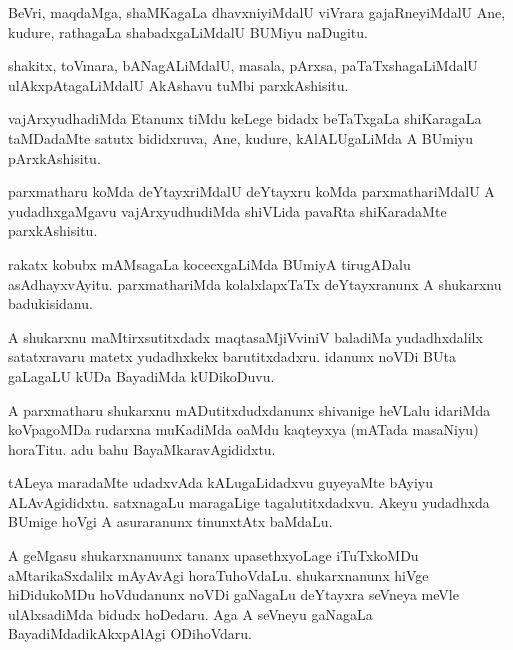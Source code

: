 \documentclass{article}
\begin{document}
\begin{mn}%
BeVri, maqdaMga, shaMKagaLa dhavxniyiMdalU viVrara gajaRneyiMdalU Ane, kudure, rathagaLa 
shabadxgaLiMdalU BUMiyu naDugitu.
\end{mn}

\begin{mn}%
shakitx, toVmara, bANagALiMdalU, masala, pArxsa, paTaTxshagaLiMdalU ulAkxpAtagaLiMdalU AkAshavu 
tuMbi parxkAshisitu.
\end{mn}

\begin{mn}%
vajArxyudhadiMda Etanunx tiMdu keLege bidadx beTaTxgaLa shiKaragaLa taMDadaMte satutx bididxruva, 
Ane, kudure, kAlALUgaLiMda A BUmiyu pArxkAshisitu.
\end{mn}

\begin{mn}%
parxmatharu koMda deYtayxriMdalU deYtayxru koMda parxmathariMdalU A yudadhxgaMgavu vajArxyudhudiMda 
shiVLida pavaRta shiKaradaMte parxkAshisitu.
\end{mn}

\begin{mn}%
rakatx kobubx mAMsagaLa kocecxgaLiMda BUmiyA tirugADalu asAdhayxvAyitu. parxmathariMda 
kolalxlapxTaTx deYtayxranunx A shukarxnu badukisidanu.
\end{mn}

\begin{mn}%
A shukarxnu maMtirxsutitxdadx maqtasaMjiVviniV baladiMa yudadhxdalilx satatxravaru matetx 
yudadhxkekx barutitxdadxru. idanunx noVDi BUta gaLagaLU kUDa BayadiMda kUDikoDuvu.
\end{mn}

\begin{mn}%
A parxmatharu shukarxnu mADutitxdudxdanunx shivanige heVLalu idariMda koVpagoMDa rudarxna muKadiMda 
oaMdu kaqteyxya (mATada masaNiyu) horaTitu. adu bahu BayaMkaravAgididxtu.
\end{mn}

\begin{mn}%
tALeya maradaMte udadxvAda kALugaLidadxvu guyeyaMte bAyiyu ALAvAgididxtu. satxnagaLu maragaLige 
tagalutitxdadxvu. Akeyu yudadhxda BUmige hoVgi A asuraranunx tinunxtAtx baMdaLu.
\end{mn}

\begin{mn}%
A geMgasu shukarxnanuunx tananx upasethxyoLage iTuTxkoMDu aMtarikaSxdalilx mAyAvAgi horaTuhoVdaLu. 
shukarxnanunx hiVge hiDidukoMDu hoVdudanunx noVDi gaNagaLu deYtayxra seVneya meVle ulAlxsadiMda 
bidudx hoDedaru. Aga A seVneyu gaNagaLa BayadiMdadikAkxpAlAgi ODihoVdaru.
\end{mn}
\end{document}
